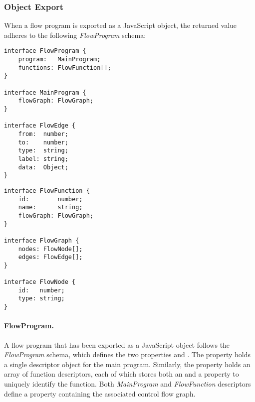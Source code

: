 \subsubsection{Object Export}
\label{sec:object-export}

When a flow program is exported as a JavaScript object, the returned value adheres to the following \textit{FlowProgram} schema:

\noindent
\begin{minipage}[t]{0.56\textwidth}
\begin{listing}[H]
\begin{verbatim}
interface FlowProgram {
    program:   MainProgram;
    functions: FlowFunction[];
}

interface MainProgram {
    flowGraph: FlowGraph;
}

interface FlowEdge {
    from:  number;
    to:    number;
    type:  string;
    label: string;
    data:  Object;
}
\end{verbatim}
\end{listing}
\end{minipage}\hfill
\begin{minipage}[t]{0.44\textwidth}
\begin{listing}[H]
\begin{verbatim}
interface FlowFunction {
    id:        number;
    name:      string;
    flowGraph: FlowGraph;
}

interface FlowGraph {
    nodes: FlowNode[];
    edges: FlowEdge[];
}

interface FlowNode {
    id:   number;
    type: string;
}
\end{verbatim}
\end{listing}
\end{minipage}

\paragraph{FlowProgram.}
A flow program that has been exported as a JavaScript object follows the \textit{FlowProgram} schema, which defines the two properties  and . The  property holds a single descriptor object for the main program. Similarly, the  property holds an array of function descriptors, each of which stores both an  and a  property to uniquely identify the function. Both \textit{MainProgram} and \textit{FlowFunction} descriptors define a  property containing the associated control flow graph.

